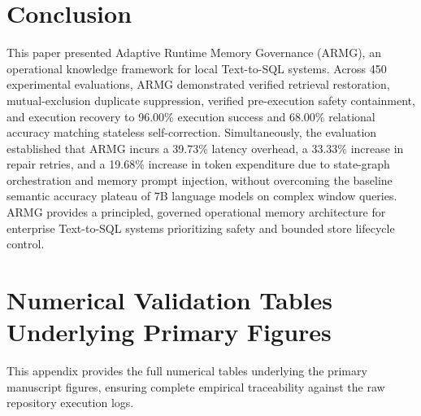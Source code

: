 \documentclass[conference]{IEEEtran}
\begin{document}
\section{Conclusion}
This paper presented Adaptive Runtime Memory Governance (ARMG), an operational knowledge framework for local Text-to-SQL systems. Across 450 experimental evaluations, ARMG demonstrated verified retrieval restoration, mutual-exclusion duplicate suppression, verified pre-execution safety containment, and execution recovery to 96.00\% execution success and 68.00\% relational accuracy matching stateless self-correction. Simultaneously, the evaluation established that ARMG incurs a 39.73\% latency overhead, a 33.33\% increase in repair retries, and a 19.68\% increase in token expenditure due to state-graph orchestration and memory prompt injection, without overcoming the baseline semantic accuracy plateau of 7B language models on complex window queries. ARMG provides a principled, governed operational memory architecture for enterprise Text-to-SQL systems prioritizing safety and bounded store lifecycle control.



\appendices

\section{Numerical Validation Tables Underlying Primary Figures}
This appendix provides the full numerical tables underlying the primary manuscript figures, ensuring complete empirical traceability against the raw repository execution logs.














\end{document}

